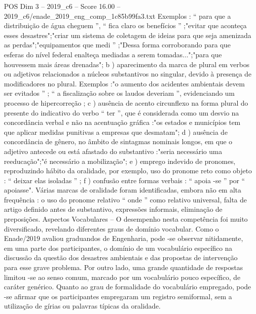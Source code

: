 \begin{textsample}{POS Dim 3 – 2019\_c6 – Score 16.00 – 2019\_c6/enade\_2019\_eng\_comp\_1c85b99fa3.txt}
Exemplos : “ para que a distribuição de água cheguem ”, “ fica claro os benefícios ” ;"evitar que aconteça esses desastres";"criar um sistema de coletagem de ideias para que seja amenizada as perdas";"equipamentos que medi ” ;"Dessa forma corroborando para que esferas do nível federal enalteça mediadas a serem tomadas...";"para que houvessem mais áreas drenadas"; b ) aparecimento da marca de plural em verbos ou adjetivos relacionados a núcleos substantivos no singular, devido à presença de modificadores no plural.
Exemplos :"o aumento dos acidentes ambientais devem ser evitados ” ; “ a fiscalização sobre os laudos deveriam ”, evidenciando um processo de hipercorreção ; c ) ausência de acento circunflexo na forma plural do presente do indicativo do verbo “ ter ”, que é considerada como um desvio na concordância verbal e não na acentuação gráfica :"os estados e municípios tem que aplicar medidas punitivas a empresas que desmatam"; d ) ausência de concordância de gênero, no âmbito de sintagmas nominais longos, em que o adjetivo antecede ou está afastado do substantivo :"seria necessário uma reeducação";"é necessário a mobilização"; e ) emprego indevido de pronomes, reproduzindo hábito da oralidade, por exemplo, uso do pronome reto como objeto : “ deixar elas isoladas ” ; f ) confusão entre formas verbais : “ apoia -se ” por “ apoiasse".
Várias marcas de oralidade foram identificadas, embora não em alta frequência : o uso do pronome relativo “ onde ” como relativo universal, falta de artigo definido antes de substantivo, expressões informais, eliminação de preposições.
Aspectos Vocabulares – O desempenho nesta competência foi muito diversificado, revelando diferentes graus de domínio vocabular.
Como o Enade/2019 avaliou graduandos de Engenharia, pode -se observar nitidamente, em uma parte dos participantes, o domínio de um vocabulário específico na discussão da questão dos desastres ambientais e das propostas de intervenção para esse grave problema.
Por outro lado, uma grande quantidade de respostas limitou -se ao senso comum, marcado por um vocabulário pouco específico, de caráter genérico.
Quanto ao grau de formalidade do vocabulário empregado, pode -se afirmar que os participantes empregaram um registro semiformal, sem a utilização de gírias ou palavras típicas da oralidade.

\end{textsample}
